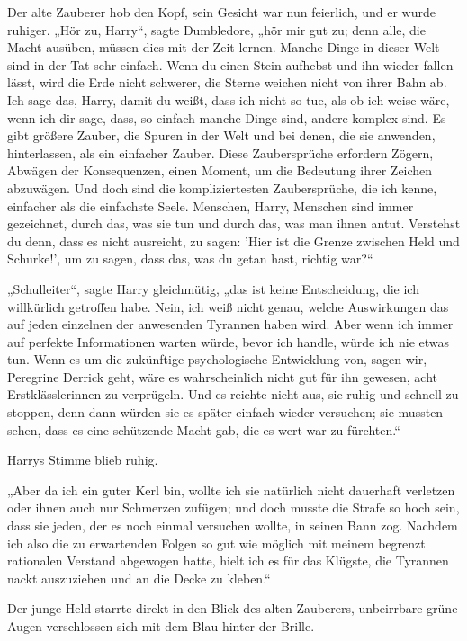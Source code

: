 {Der alte Zauberer hob den Kopf, sein Gesicht war nun feierlich, und er wurde ruhiger. „Hör zu, Harry“, sagte Dumbledore, „hör mir gut zu; denn alle, die Macht ausüben, müssen dies mit der Zeit lernen. Manche Dinge in dieser Welt sind in der Tat sehr einfach. Wenn du einen Stein aufhebst und ihn wieder fallen lässt, wird die Erde nicht schwerer, die Sterne weichen nicht von ihrer Bahn ab. Ich sage das, Harry, damit du weißt, dass ich nicht so tue, als ob ich weise wäre, wenn ich dir sage, dass, so einfach manche Dinge sind, andere komplex sind. Es gibt größere Zauber, die Spuren in der Welt und bei denen, die sie anwenden, hinterlassen, als ein einfacher Zauber. Diese Zaubersprüche erfordern Zögern, Abwägen der Konsequenzen, einen Moment, um die Bedeutung ihrer Zeichen abzuwägen. Und doch sind die kompliziertesten Zaubersprüche, die ich kenne, einfacher als die einfachste Seele. Menschen, Harry, Menschen sind immer gezeichnet, durch das, was sie tun und durch das, was man ihnen antut. Verstehst du denn, dass es nicht ausreicht, zu sagen: 'Hier ist die Grenze zwischen Held und Schurke!', um zu sagen, dass das, was du getan hast, richtig war?“

„Schulleiter“, sagte Harry gleichmütig, „das ist keine Entscheidung, die ich willkürlich getroffen habe. Nein, ich weiß nicht genau, welche Auswirkungen das auf jeden einzelnen der anwesenden Tyrannen haben wird. Aber wenn ich immer auf perfekte Informationen warten würde, bevor ich handle, würde ich nie etwas tun. Wenn es um die zukünftige psychologische Entwicklung von, sagen wir, Peregrine Derrick geht, wäre es wahrscheinlich nicht gut für ihn gewesen, acht Erstklässlerinnen zu verprügeln. Und es reichte nicht aus, sie ruhig und schnell zu stoppen, denn dann würden sie es später einfach wieder versuchen; sie mussten sehen, dass es eine schützende Macht gab, die es wert war zu fürchten.“

Harrys Stimme blieb ruhig.

„Aber da ich ein guter Kerl bin, wollte ich sie natürlich nicht dauerhaft verletzen oder ihnen auch nur Schmerzen zufügen; und doch musste die Strafe so hoch sein, dass sie jeden, der es noch einmal versuchen wollte, in seinen Bann zog. Nachdem ich also die zu erwartenden Folgen so gut wie möglich mit meinem begrenzt rationalen Verstand abgewogen hatte, hielt ich es für das Klügste, die Tyrannen nackt auszuziehen und an die Decke zu kleben.“

Der junge Held starrte direkt in den Blick des alten Zauberers, unbeirrbare grüne Augen verschlossen sich mit dem Blau hinter der Brille.

}
